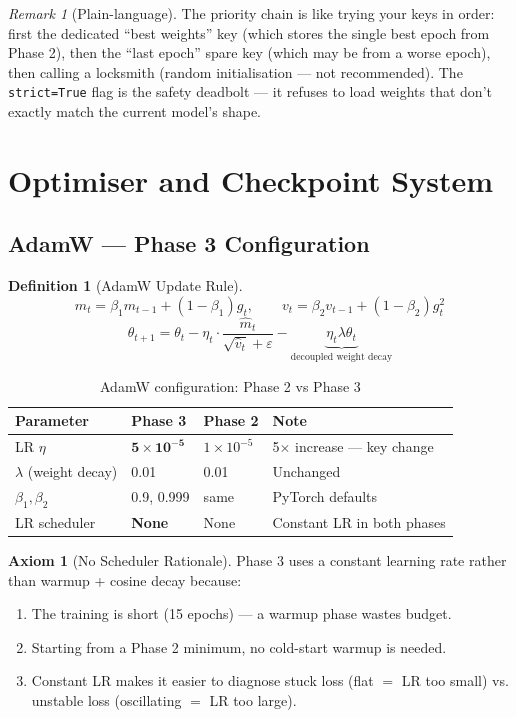 \documentclass[12pt,a4paper]{article}
\theoremstyle{definition}
\newtheorem{definition}[theorem]{Definition}
\newtheorem{axiom}[theorem]{Axiom}
\theoremstyle{remark}
\newtheorem{remark}[theorem]{Remark}
\begin{document}
\begin{remark}[Plain-language]
The priority chain is like trying your keys in order: first the dedicated
``best weights'' key (which stores the single best epoch from Phase 2),
then the ``last epoch'' spare key (which may be from a worse epoch),
then calling a locksmith (random initialisation — not recommended).
The \texttt{strict=True} flag is the safety deadbolt — it refuses to load
weights that don't exactly match the current model's shape.
\end{remark}

\section{Optimiser and Checkpoint System}

\subsection{AdamW — Phase 3 Configuration}

\begin{definition}[AdamW Update Rule]
\[
  m_t = \beta_1 m_{t-1} + (1-\beta_1) g_t, \qquad
  v_t = \beta_2 v_{t-1} + (1-\beta_2) g_t^2
\]
\[
  \theta_{t+1} = \theta_t
    - \eta_t \cdot \frac{\hat{m}_t}{\sqrt{\hat{v}_t} + \varepsilon}
    - \underbrace{\eta_t \lambda \theta_t}_{\text{decoupled weight decay}}
\]
\end{definition}

\begin{table}[H]
\centering
\caption{AdamW configuration: Phase 2 vs Phase 3}
\begin{tabular}{llll}
\toprule
Parameter & Phase 3 & Phase 2 & Note \\
\midrule
LR $\eta$ & $\mathbf{5\times10^{-5}}$ & $1\times10^{-5}$ & 5$\times$ increase — key change \\
$\lambda$ (weight decay) & 0.01 & 0.01 & Unchanged \\
$\beta_1, \beta_2$ & 0.9, 0.999 & same & PyTorch defaults \\
LR scheduler & \textbf{None} & None & Constant LR in both phases \\
\bottomrule
\end{tabular}
\end{table}

\begin{axiom}[No Scheduler Rationale]
Phase 3 uses a constant learning rate rather than warmup + cosine decay
because:
\begin{enumerate}
  \item The training is short (15 epochs) — a warmup phase wastes budget.
  \item Starting from a Phase 2 minimum, no cold-start warmup is needed.
  \item Constant LR makes it easier to diagnose stuck loss (flat $=$ LR too small)
        vs. unstable loss (oscillating $=$ LR too large).
\end{enumerate}
\end{axiom}
\end{document}
